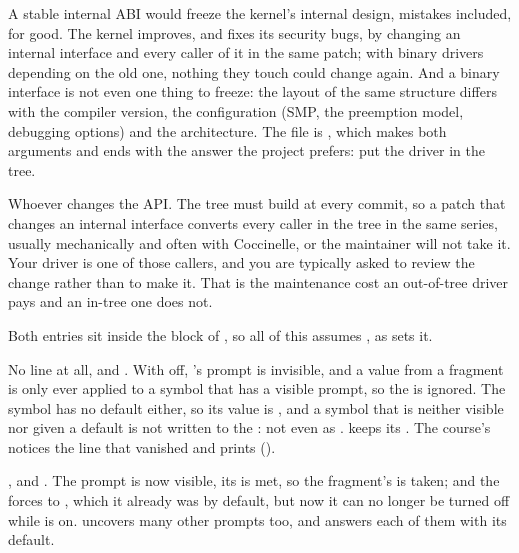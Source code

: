  A stable internal ABI would freeze the kernel's internal design, mistakes included, for
good. The kernel improves, and fixes its security bugs, by changing an internal interface and every
caller of it in the same patch; with binary drivers depending on the old one, nothing they touch
could change again. And a binary interface is not even one thing to freeze: the layout of the same
structure differs with the compiler version, the configuration (SMP, the preemption model, debugging
options) and the architecture. The file is ,
which makes both arguments and ends with the answer the project prefers: put the driver in the tree.

 Whoever changes the API. The tree must build at every commit, so a patch that changes an
internal interface converts every caller in the tree in the same series, usually mechanically and
often with Coccinelle, or the maintainer will not take it. Your driver is one of those callers, and
you are typically asked to review the change rather than to make it. That is the maintenance cost
an out-of-tree driver pays and an in-tree one does not.


Both entries sit inside the  block of , so all of this
assumes , as  sets it.

 No  line at all, and . With  off,
's prompt is invisible, and a value from a fragment is only ever applied to a
symbol that has a visible prompt, so the  is ignored. The symbol has no default either, so
its value is , and a symbol that is neither visible nor given a default is not written to
the : not even as .  keeps its
. The course's  notices the line that vanished and prints
 ().

 ,  and . The
prompt is now visible, its  is met, so the fragment's  is taken; and
the  forces  to , which it already was by default, but now it
can no longer be turned off while  is on.  uncovers many other
prompts too, and  answers each of them with its default.

